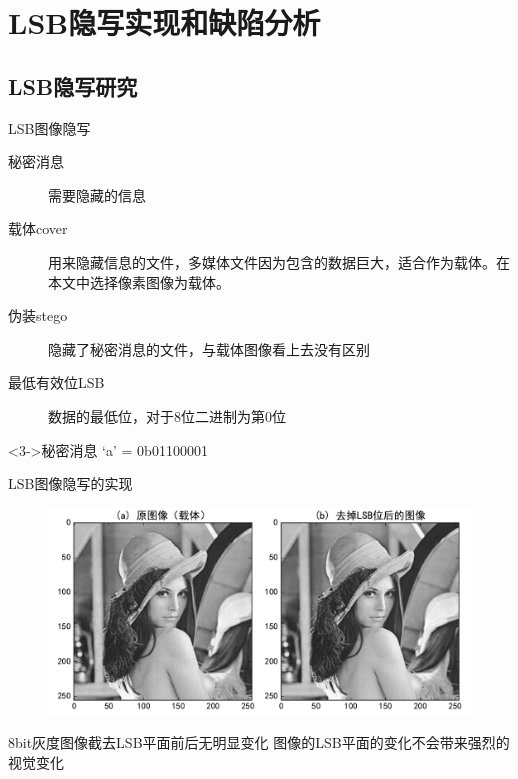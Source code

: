 \documentclass[14pt]{Bredelebeamer}
\begin{document}
\section{LSB隐写实现和缺陷分析}
\subsection{LSB隐写研究}
\begin{frame}{LSB图像隐写}
\begin{description}
  \item[秘密消息] 需要隐藏的信息
  \item[载体cover] 用来隐藏信息的文件，多媒体文件因为包含的数据巨大，适合作为载体。在本文中选择像素图像为载体。
  \item[伪装stego] 隐藏了秘密消息的文件，与载体图像看上去没有区别
  \item[最低有效位LSB] 数据的最低位，对于8位二进制为第0位 
\end{description}
\begin{alertblock}<3->{秘密消息}
  `a' = 0b\textcolor<4>{alertTitleBlockColor}{01100001}
\end{alertblock}

\pause



\end{frame}

\begin{frame}{LSB图像隐写的实现}
    \begin{figure}
      \centering
      \includegraphics[width=.9\textwidth]{images/demo1}
    \end{figure}
    \begin{alertblock}{8bit灰度图像截去LSB平面前后无明显变化}
      图像的LSB平面的变化不会带来强烈的视觉变化
    \end{alertblock}
\end{frame}
\end{document}
